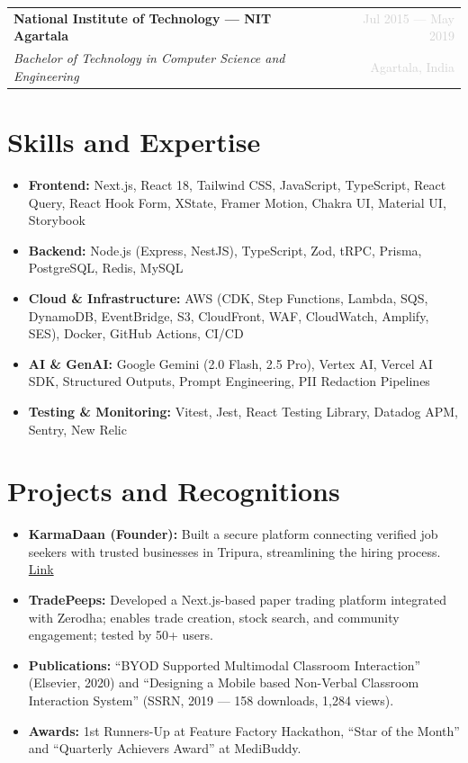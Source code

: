 \documentclass[letterpaper,10.5pt]{article}
\newcommand{\resumeItem}[1]{\item\small{#1}}
\newcommand{\resumeSubheading}[4]{
  \vspace{2pt}
  \begin{tabularx}{\textwidth}{Xr}
    \textbf{#1} & \textcolor{lightgray}{\small #2} \\
    \textit{\small #3} & \textcolor{lightgray}{\small #4} \\
  \end{tabularx}
  \vspace{-4pt}
}
\begin{document}
\resumeSubheading
  {National Institute of Technology --- NIT Agartala}{Jul 2015 --- May 2019}
  {Bachelor of Technology in Computer Science and Engineering}{Agartala, India}

\section{Skills and Expertise}

\begin{itemize}[leftmargin=14pt, itemsep=1.5pt, parsep=0pt, topsep=2pt]
  \resumeItem{\textbf{Frontend:} Next.js, React 18, Tailwind CSS, JavaScript, TypeScript, React Query, React Hook Form, XState, Framer Motion, Chakra UI, Material UI, Storybook}
  \resumeItem{\textbf{Backend:} Node.js (Express, NestJS), TypeScript, Zod, tRPC, Prisma, PostgreSQL, Redis, MySQL}
  \resumeItem{\textbf{Cloud \& Infrastructure:} AWS (CDK, Step Functions, Lambda, SQS, DynamoDB, EventBridge, S3, CloudFront, WAF, CloudWatch, Amplify, SES), Docker, GitHub Actions, CI/CD}
  \resumeItem{\textbf{AI \& GenAI:} Google Gemini (2.0 Flash, 2.5 Pro), Vertex AI, Vercel AI SDK, Structured Outputs, Prompt Engineering, PII Redaction Pipelines}
  \resumeItem{\textbf{Testing \& Monitoring:} Vitest, Jest, React Testing Library, Datadog APM, Sentry, New Relic}
\end{itemize}

\section{Projects and Recognitions}

\begin{itemize}[leftmargin=14pt, itemsep=1.5pt, parsep=0pt, topsep=2pt]
  \resumeItem{\textbf{KarmaDaan (Founder):} Built a secure platform connecting verified job seekers with trusted businesses in Tripura, streamlining the hiring process. \href{https://karmadaan.org}{Link}}
  \resumeItem{\textbf{TradePeeps:} Developed a Next.js-based paper trading platform integrated with Zerodha; enables trade creation, stock search, and community engagement; tested by 50+ users.}
  \resumeItem{\textbf{Publications:} ``BYOD Supported Multimodal Classroom Interaction'' (Elsevier, 2020) and ``Designing a Mobile based Non-Verbal Classroom Interaction System'' (SSRN, 2019 --- 158 downloads, 1,284 views).}
  \resumeItem{\textbf{Awards:} 1st Runners-Up at Feature Factory Hackathon, ``Star of the Month'' and ``Quarterly Achievers Award'' at MediBuddy.}
\end{itemize}
\end{document}
